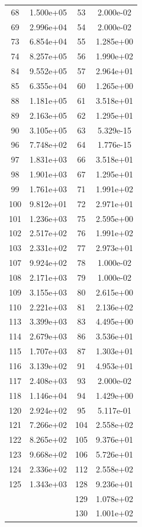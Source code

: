 \documentclass[12pt]{article}
\begin{document}
\begin{longtable}{@{}cccc@{}}
68 & 1.500e+05 & 53 & 2.000e-02 \\
69 & 2.996e+04 & 54 & 2.000e-02 \\
73 & 6.854e+04 & 55 & 1.285e+00 \\
74 & 8.257e+05 & 56 & 1.990e+02 \\
84 & 9.552e+05 & 57 & 2.964e+01 \\
85 & 6.355e+04 & 60 & 1.265e+00 \\
88 & 1.181e+05 & 61 & 3.518e+01 \\
89 & 2.163e+05 & 62 & 1.295e+01 \\
90 & 3.105e+05 & 63 & 5.329e-15 \\
96 & 7.748e+02 & 64 & 1.776e-15 \\
97 & 1.831e+03 & 66 & 3.518e+01 \\
98 & 1.901e+03 & 67 & 1.295e+01 \\
99 & 1.761e+03 & 71 & 1.991e+02 \\
100 & 9.812e+01 & 72 & 2.971e+01 \\
101 & 1.236e+03 & 75 & 2.595e+00 \\
102 & 2.517e+02 & 76 & 1.991e+02 \\
103 & 2.331e+02 & 77 & 2.973e+01 \\
107 & 9.924e+02 & 78 & 1.000e-02 \\
108 & 2.171e+03 & 79 & 1.000e-02 \\
109 & 3.155e+03 & 80 & 2.615e+00 \\
110 & 2.221e+03 & 81 & 2.136e+02 \\
113 & 3.399e+03 & 83 & 4.495e+00 \\
114 & 2.679e+03 & 86 & 3.536e+01 \\
115 & 1.707e+03 & 87 & 1.303e+01 \\
116 & 3.139e+02 & 91 & 4.953e+01 \\
117 & 2.408e+03 & 93 & 2.000e-02 \\
118 & 1.146e+04 & 94 & 1.429e+00 \\
120 & 2.924e+02 & 95 & 5.117e-01 \\
121 & 7.266e+02 & 104 & 2.558e+02 \\
122 & 8.265e+02 & 105 & 9.376e+01 \\
123 & 9.668e+02 & 106 & 5.726e+01 \\
124 & 2.336e+02 & 112 & 2.558e+02 \\
125 & 1.343e+03 & 128 & 9.236e+01 \\
 &  & 129 & 1.078e+02 \\
 &  & 130 & 1.001e+02 \\

\end{longtable}
\end{document}
